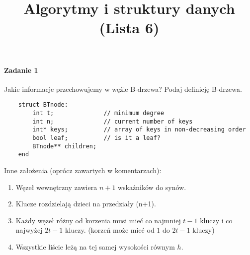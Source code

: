\documentclass[18pt]{extarticle}
\begin{document}
\large
{}\selectfont

\title{Algorytmy i struktury danych (Lista 6)}
\date{}
\maketitle

\paragraph{Zadanie 1} Jakie informacje przechowujemy w węźle B-drzewa? Podaj definicję B-drzewa. \\

\begin{lstlisting}
    struct BTnode:
        int t;              // minimum degree
        int n;              // current number of keys
        int* keys;          // array of keys in non-decreasing order
        bool leaf;          // is it a leaf?
        BTnode** children;
    end
\end{lstlisting}
Inne założenia (oprócz zawartych w komentarzach):
\begin{enumerate}
    \item Węzeł wewnętrzny zawiera $n+1$ wskaźników do synów.
    \item Klucze rozdzielają dzieci na przedziały (n+1).
    \item Każdy węzeł różny od korzenia musi mieć co najmniej $t-1$ kluczy i co najwyżej $2t-1$ kluczy. (korzeń może mieć od $1$ do $2t-1$ kluczy)
    \item Wszystkie liście leżą na tej samej wysokości równym $h$.
\end{enumerate}
\end{document}

